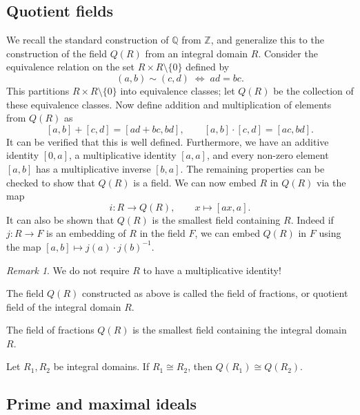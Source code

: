 \documentclass[11pt]{article}
\newcommand{\Q}{\mathbb{Q}}
\newcommand{\Z}{\mathbb{Z}}
\theoremstyle{definition}
\theoremstyle{remark}
\newtheorem*{remark}{Remark}
\numberwithin{equation}{section}
\begin{document}
    \subsection{Quotient fields}

    We recall the standard construction of $\Q$ from $\Z$, and generalize this to the
    construction of the field $Q(R)$ from an integral domain $R$. Consider the
    equivalence relation on the set $R \times R\setminus\{0\}$ defined by \[
        (a, b) \sim (c, d) \;\Longleftrightarrow\; ad = bc.
    \] This partitions $R \times R\setminus\{0\}$ into equivalence classes; let $Q(R)$
    be the collection of these equivalence classes. Now define addition and
    multiplication of elements from $Q(R)$ as \[
        [a, b] + [c, d] = [ad + bc, bd], \qquad [a, b] \cdot [c, d] = [ac, bd].
    \] It can be verified that this is well defined. Furthermore, we have an additive
    identity $[0, a]$, a multiplicative identity $[a, a]$, and every non-zero element
    $[a, b]$ has a multiplicative inverse $[b, a]$. The remaining properties can be
    checked to show that $Q(R)$ is a field. We can now embed $R$ in $Q(R)$ via the
    map \[
        i\colon R \to Q(R), \qquad x \mapsto [ax, a].
    \] It can also be shown that $Q(R)$ is the smallest field containing $R$. Indeed
    if $j\colon R \to F$ is an embedding of $R$ in the field $F$, we can embed $Q(R)$
    in $F$ using the map $[a, b] \mapsto j(a)\cdot j(b)^{-1}$.

    \begin{remark}
        We do not require $R$ to have a multiplicative identity!
    \end{remark}

    \begin{definition}
        The field $Q(R)$ constructed as above is called the field of fractions, or
        quotient field of the integral domain $R$.
    \end{definition}

    \begin{lemma}
        The field of fractions $Q(R)$ is the smallest field containing the integral
        domain $R$.
    \end{lemma}

    \begin{lemma}
        Let $R_1, R_2$ be integral domains. If $R_1 \cong R_2$, then $Q(R_1) \cong
        Q(R_2)$.
    \end{lemma}


    \subsection{Prime and maximal ideals}
    
\end{document}
